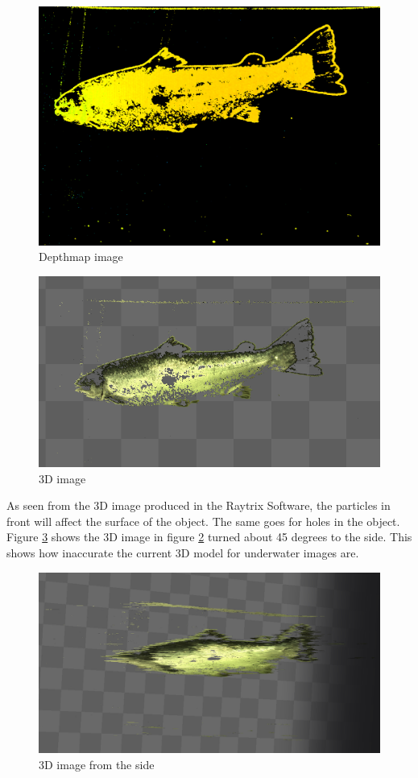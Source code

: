 \begin{figure}[h]
    \centering
    \includegraphics[width=.9\linewidth]{images/introduction/depthmap}
    \caption{Depthmap image}
    \label{fig:depthmap}
\end{figure}

\begin{figure}[h]
    \centering
    \includegraphics[width=.9\linewidth]{images/introduction/depth3D}
    \caption{3D image}
    \label{fig:3d_image}
\end{figure}

As seen from the 3D image produced in the Raytrix Software, the particles in front will affect the surface of the object. The same goes for holes in the object. Figure \ref{fig:3d_image_side} shows the 3D image in figure \ref{fig:3d_image} turned about 45 degrees to the side. This shows how inaccurate the current 3D model for underwater images are. 

\begin{figure}[h]
    \centering
    \includegraphics[width=.9\linewidth]{images/introduction/depth3D_side}
    \caption{3D image from the side}
    \label{fig:3d_image_side}
\end{figure}

